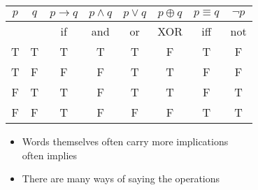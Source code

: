 \documentclass[headrule,footrule]{foils}
\begin{document}

\begin{center}
  \begin{tabular}{|c|c|c|c|c|c|c|c|}
    \hline
    $p$ & $q$ & $p \rightarrow q$ & $p \wedge q$ & $p \vee q$ 
    & $p \oplus q$ & $p \equiv q$ & $\neg p$\\
    \hline
    &   & if & and & or &  XOR & iff & not  \\
    \hline
    T & T & T & T & T & F & T & F \\ 
    T & F & F & F & T & T & F & F \\  
    F & T & T & F & T & T & F & T\\ 
    F & F & T & F & F & F & T & T\\ \hline
  \end{tabular}
  \begin{itemize}
  \item Words themselves often carry more implications
    \\  often implies 
  \item There are many ways of saying the operations
  \end{itemize}
\end{center}
\end{document}
